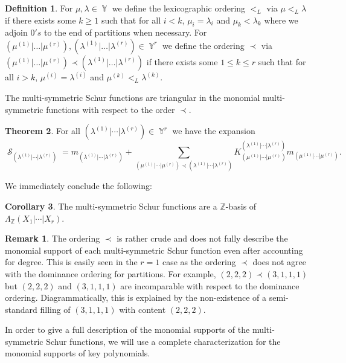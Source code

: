 \documentclass[12pt,reqno]{amsart}
\theoremstyle{definition}
\newtheorem{thm}{Theorem}[section]
\newtheorem{cor}[thm]{Corollary}
\newtheorem{defn}[thm]{Definition}
\newtheorem{remark}{Remark}
\DeclareMathOperator{\Par}{\mathbb{Y}}
\DeclareMathOperator{\cS}{\mathcal{S}}
\begin{document}
\begin{defn}
For $\mu,\lambda \in \Par$ we define the lexicographic ordering $<_L$ via $\mu <_L \lambda$ if 
there exists some $k \geq 1$ such that for all $i < k$, $\mu_i = \lambda_i$ and $\mu_k < \lambda_k$ where we adjoin $0's$ to the end of partitions when necessary. For $(\mu^{(1)}|\ldots | \mu^{(r)}),(\lambda^{(1)}|\ldots | \lambda^{(r)}) \in \Par^r$ we define the ordering $\prec$ via $(\mu^{(1)}|\ldots | \mu^{(r)}) \prec (\lambda^{(1)}|\ldots | \lambda^{(r)})$ if there exists some $1\leq k \leq r$ such that for all $i > k$, $\mu^{(i)} = \lambda^{(i)}$ and $\mu^{(k)} <_L \lambda^{(k)}.$
\end{defn}

The multi-symmetric Schur functions are triangular in the monomial multi-symmetric functions with respect to the order $\prec$.


\begin{thm}\label{crude triangularity thm}
For all $(\lambda^{(1)}|\cdots | \lambda^{(r)}) \in \Par^r$ we have the expansion
$$\cS_{(\lambda^{(1)}|\cdots | \lambda^{(r)})} = m_{(\lambda^{(1)}|\cdots | \lambda^{(r)})} +\sum_{(\mu^{(1)}|\cdots | \mu^{(r)}) \prec (\lambda^{(1)}|\cdots | \lambda^{(r)}) } K_{(\mu^{(1)}|\cdots | \mu^{(r)})}^{(\lambda^{(1)}|\cdots | \lambda^{(r)})} m_{(\mu^{(1)}|\cdots | \mu^{(r)})}.$$
\end{thm}

We immediately conclude the following:

\begin{cor}\label{Z basis Cor.}
    The multi-symmetric Schur functions are a $\mathbb{Z}$-basis of $\Lambda_{\mathbb{Z}}(X_1|\cdots | X_r).$
\end{cor}

\begin{remark}
    The ordering $\prec$ is rather crude and does not fully describe the monomial support of each multi-symmetric Schur function even after accounting for degree. This is easily seen in the $r= 1$ case as the ordering $\prec$ does not agree with the dominance ordering for partitions. For example, $(2,2,2) \prec (3,1,1,1)$ but $(2,2,2)$ and $(3,1,1,1)$ are incomparable with respect to the dominance ordering. Diagrammatically, this is explained by the non-existence of a semi-standard filling of $(3,1,1,1)$ with content $(2,2,2).$
\end{remark}


In order to give a full description of the monomial supports of the multi-symmetric Schur functions, we will use a complete characterization for the monomial supports of key polynomials. 
\end{document}
